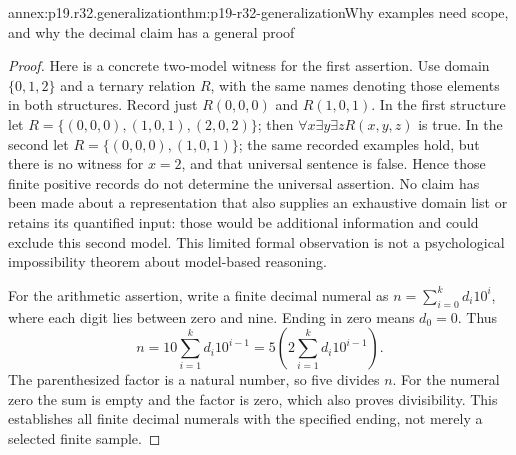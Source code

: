 \begin{annexitem}{annex:p19.r32.generalization}{thm:p19-r32-generalization}{Why examples need scope, and why the decimal claim has a general proof}
\begin{proof}
Here is a concrete two-model witness for the first assertion. Use
domain \(\{0,1,2\}\) and a ternary relation \(R\), with the same
names denoting those elements in both structures. Record just
\(R(0,0,0)\) and \(R(1,0,1)\). In the first structure let
\(R=\{(0,0,0),(1,0,1),(2,0,2)\}\); then
\(\forall x\exists y\exists zR(x,y,z)\) is true. In the second
let \(R=\{(0,0,0),(1,0,1)\}\); the same recorded examples hold,
but there is no witness for \(x=2\), and that universal sentence
is false. Hence those finite positive records do not determine the
universal assertion. No claim has been made about a representation
that also supplies an exhaustive domain list or retains its quantified
input: those would be additional information and could exclude this
second model. This limited formal observation is not a psychological
impossibility theorem about model-based reasoning.

For the arithmetic assertion, write a finite decimal numeral as
\(n=\sum_{i=0}^{k}d_i10^i\), where each digit lies between zero
and nine. Ending in zero means \(d_0=0\). Thus
\[
 n=10\sum_{i=1}^{k}d_i10^{i-1}
   =5\left(2\sum_{i=1}^{k}d_i10^{i-1}\right).
\]
The parenthesized factor is a natural number, so five divides \(n\).
For the numeral zero the sum is empty and the factor is zero, which
also proves divisibility. This establishes all finite decimal numerals
with the specified ending, not merely a selected finite sample.
\end{proof}
\end{annexitem}
